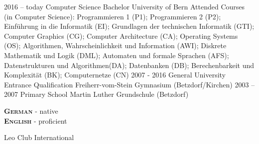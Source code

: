 \documentclass[9pt]{developercv} %
\begin{document}


\begin{entrylist}
	\entry
		{2016 -- today}
		{Computer Science Bachelor}
		{University of Bern}
		{Attended Courses (in Computer Science): Programmieren 1 (P1); Programmieren 2 (P2); Einführung in die Informatik (EI); Grundlagen der technischen Informatik (GTI); Computer Graphics (CG); Computer Architecture (CA); Operating Systems (OS); Algorithmen, Wahrscheinlichkeit und Information (AWI); Diskrete Mathematik und Logik (DML); Automaten und formale Sprachen (AFS); Datenstrukturen und Algorithmen(DA); Datenbanken (DB); Berechenbarkeit und Komplexität (BK); Computernetze (CN)}
	\entry
		{2007 - 2016}
		{General University Entrance Qualification}
		{Freiherr-vom-Stein Gymnasium (Betzdorf/Kirchen)}
		{}
	\entry
		{2003 -- 2007}
		{Primary School}
		{Martin Luther Grundschule (Betzdorf)}
		{}
\end{entrylist}


\begin{minipage}[t]{0.3\textwidth}
	\vspace{-\baselineskip} %

	
	\textbf{\textsc{German}} - native\\
	\textbf{\textsc{English}} - proficient
\end{minipage}
\hfill
\begin{minipage}[t]{0.3\textwidth}
	\vspace{-\baselineskip} %
	
\end{minipage}
\hfill
\begin{minipage}[t]{0.3\textwidth}
	\vspace{-\baselineskip} %
	
	
	Leo Club International
\end{minipage}

\end{document}
